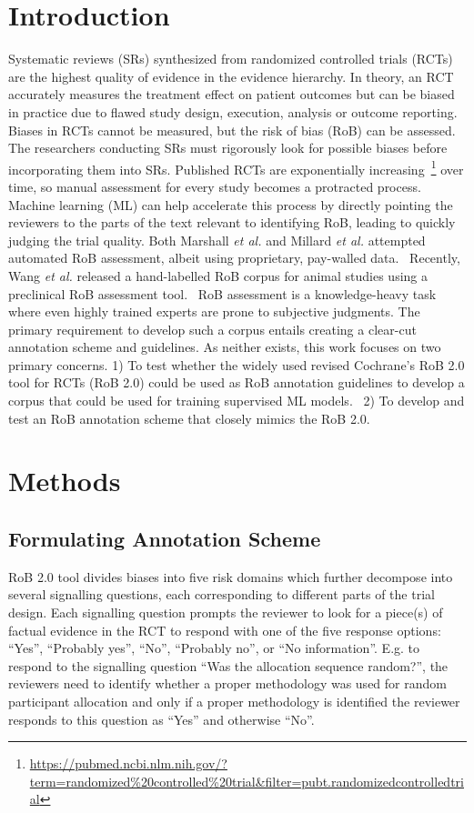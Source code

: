 \documentclass{IOS-Book-Article}
\begin{document}
\section{Introduction}
\label{sec:intro}
%
Systematic reviews (SRs) synthesized from randomized controlled trials (RCTs) are the highest quality of evidence in the evidence hierarchy.
In theory, an RCT accurately measures the treatment effect on patient outcomes but can be biased in practice due to flawed study design, execution, analysis or outcome reporting.~\cite{hariton2018randomised}
Biases in RCTs cannot be measured, but the risk of bias (RoB) can be assessed.
The researchers conducting SRs must rigorously look for possible biases before incorporating them into SRs.
Published RCTs are exponentially increasing~\footnote{\url{https://pubmed.ncbi.nlm.nih.gov/?term=randomized\%20controlled\%20trial&filter=pubt.randomizedcontrolledtrial}} over time, so manual assessment for every study becomes a protracted process.
Machine learning (ML) can help accelerate this process by directly pointing the reviewers to the parts of the text relevant to identifying RoB, leading to quickly judging the trial quality.
Both Marshall \textit{et al.} and Millard \textit{et al.} attempted automated RoB assessment, albeit using proprietary, pay-walled data.~\cite{marshall2015automating,millard2016machine}
Recently, Wang \textit{et al.} released a hand-labelled RoB corpus for animal studies using a preclinical RoB assessment tool.~\cite{wang2022risk}
RoB assessment is a knowledge-heavy task where even highly trained experts are prone to subjective judgments.
The primary requirement to develop such a corpus entails creating a clear-cut annotation scheme and guidelines.
As neither exists, this work focuses on two primary concerns.
1) To test whether the widely used revised Cochrane's RoB 2.0 tool for RCTs (RoB 2.0) could be used as RoB annotation guidelines to develop a corpus that could be used for training supervised ML models.~\cite{lansbury2020co}
2) To develop and test an RoB annotation scheme that closely mimics the RoB 2.0.~\cite{sterne2019rob}
%
%
%
\section{Methods}
\label{sec:methods}
%
\subsection{Formulating Annotation Scheme}
%
RoB 2.0 tool divides biases into five risk domains which further decompose into several signalling questions, each corresponding to different parts of the trial design.
Each signalling question prompts the reviewer to look for a piece(s) of factual evidence in the RCT to respond with one of the five response options: ``Yes'', ``Probably yes'', ``No'', ``Probably no'', or ``No information''.
E.g. to respond to the signalling question ``Was the allocation sequence random?'', the reviewers need to identify whether a proper methodology was used for random participant allocation and only if a proper methodology is identified the reviewer responds to this question as ``Yes'' and otherwise ``No''.
\end{document}
